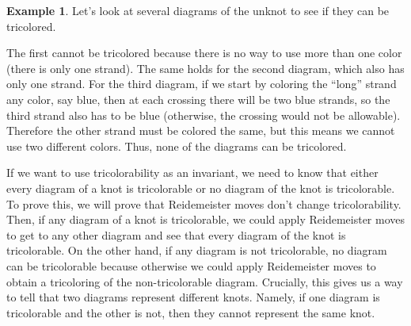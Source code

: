 \documentclass{article}
\theoremstyle{definition}
\newtheorem{exa}[thm]{Example}
\theoremstyle{remark}
\begin{document}
\begin{exa}\label{exa:tricolor unknot}
	Let's look at several diagrams of the unknot to see if they can be tricolored.
	\begin{center}
	\end{center}
	The first cannot be tricolored because there is no way to use more than one color (there is only one strand). The same holds for the second diagram, which also has only one strand. For the third diagram, if we start by coloring the ``long'' strand any color, say blue, then at each crossing there will be two blue strands, so the third strand also has to be blue (otherwise, the crossing would not be allowable). Therefore the other strand must be colored the same, but this means we cannot use two different colors. Thus, none of the diagrams can be tricolored.
\end{exa}

If we want to use tricolorability as an invariant, we need to know that either every diagram of a knot is tricolorable or no diagram of the knot is tricolorable. To prove this, we will prove that Reidemeister moves don't change tricolorability. Then, if any diagram of a knot is tricolorable, we could apply Reidemeister moves to get to any other diagram and see that every diagram of the knot is tricolorable. On the other hand, if any diagram is not tricolorable, no diagram can be tricolorable because otherwise we could apply Reidemeister moves to obtain a tricoloring of the non-tricolorable diagram. Crucially, this gives us a way to tell that two diagrams represent different knots. Namely, if one diagram is tricolorable and the other is not, then they cannot represent the same knot.
\end{document}
